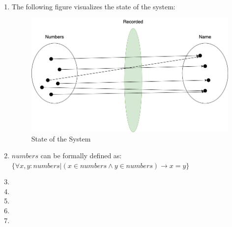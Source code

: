 \begin{enumerate}
    \item The following figure visualizes the state of the system:
        \begin{figure}[h]
        \centering
        \includegraphics[scale=0.45]{images/Diagram.png}
        \caption{State of the System}
        \label{fig:Diagram}
        \end{figure}
    \item $numbers$ can be formally defined as: \\
    $\{ \forall x, y: numbers | (x \in numbers \wedge y \in numbers) \rightarrow x = y \}$
    \item
    \item
    \item
    \item
    \item
\end{enumerate}
